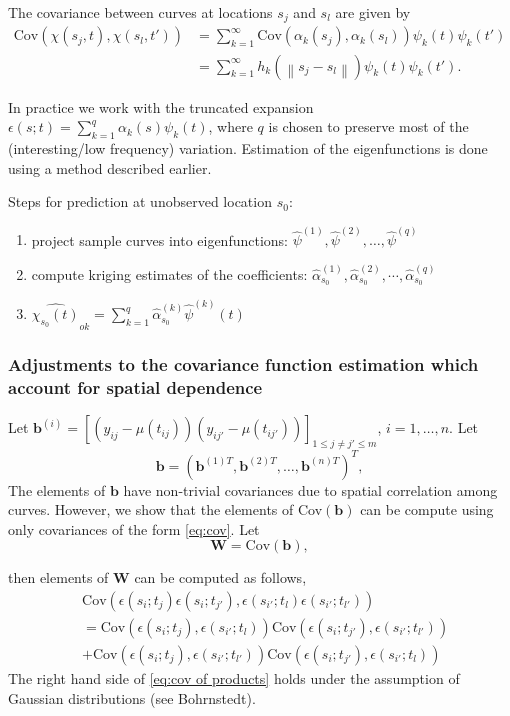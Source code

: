 \documentclass{beamer}
\newcommand{\norm}[1]{\left\|#1\right\|}
\begin{document}
\begin{frame}
The covariance between curves at locations $s_j$ and $s_l$ are given by 
\begin{align}
	\text{Cov}(\chi(s_j,t), \chi(s_l, t')) &= \sum_{k=1}^{\infty}\text{Cov}(\alpha_k(s_j), \alpha_k(s_l))\psi_k(t)\psi_k(t')\\
	&= \sum_{k=1}^{\infty}h_k(\norm{s_j-s_l})\psi_k(t)\psi_k(t'). 
	\label{eq:cov}
\end{align}

In practice we work with the truncated expansion $\epsilon(s;t) = \sum_{k=1}^{q} \alpha_k(s)\psi_k(t)$, where $q$ is chosen to preserve most of the (interesting/low frequency) variation. Estimation of the eigenfunctions is done using a method described earlier.
\end{frame}


\frame
{
Steps for prediction at unobserved location $s_0$:
\begin{enumerate}
\item project sample curves into eigenfunctions: $\hat{\psi}^{(1)}, \hat{\psi}^{(2)}, \dots, \hat{\psi}^{(q)}$ 
\item compute kriging estimates of the coefficients: $\hat{\alpha}_{s_0}^{(1)}, \hat{\alpha}_{s_0}^{(2)}, \cdots, \hat{\alpha}_{s_0}^{(q)}$ 
\item $\widehat{\chi_{s_0}(t)}_{ok} = \sum_{k=1}^{q} \hat{\alpha}_{s_0}^{(k)}\hat{\psi}^{(k)}(t)$
\end{enumerate}

}


\begin{frame}
\frametitle{Adjustments to the covariance function estimation which account for spatial dependence}

Let $\mathbf{b}^{(i)} = [(y_{ij}-\mu(t_{ij}))(y_{ij'}-\mu(t_{ij'}))]_{1\leq j\neq j'\leq m}$, $i=1, \dots, n$. Let
\[
\mathbf{b} = (\mathbf{b}^{(1)T}, \mathbf{b}^{(2)T}, \dots, \mathbf{b}^{(n)T}   )^T,
\]
 The elements of $\mathbf{b}$ have non-trivial covariances due to spatial correlation among curves. However, we show that the elements of Cov$(\mathbf{b})$ can be compute using only covariances of the form \eqref{eq:cov}. Let
\[
\mathbf{W}= \text{Cov}(\mathbf{b}), 
\]

then elements of $\mathbf{W}$ can be computed as follows,
\begin{align} 
	&\text{Cov}(\epsilon(s_i; t_{j}) \epsilon(s_i;t_{j'}), \epsilon(s_{i'}; t_{l}) \epsilon(s_{i'};t_{l'}) ) \nonumber\\
	&= 
	  \text{Cov}(\epsilon(s_i; t_{j}), \epsilon(s_{i'}; t_{l}))\text{Cov}( \epsilon(s_i;t_{j'}), \epsilon(s_{i'};t_{l'})  ) \nonumber \\
	&+
		 \text{Cov}(\epsilon(s_i; t_{j}),  \epsilon(s_{i'};t_{l'}) )\text{Cov}(\epsilon(s_i;t_{j'}), \epsilon(s_{i'}; t_{l})) \label{eq:cov of products}
\end{align}
The right hand side of \eqref{eq:cov of products} holds under the assumption of Gaussian distributions (see Bohrnstedt). 
\end{frame}
\end{document}
